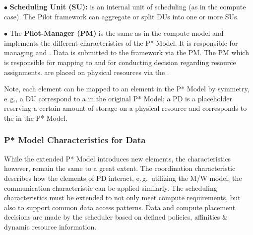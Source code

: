 \documentclass[conference]{IEEEtran}
\begin{document}
\noindent$\bullet$
  \textbf{Scheduling Unit (SU):} is an internal unit of scheduling (as in 
  the compute case). The Pilot framework can aggregate or split DUs into one 
  or more SUs.

\noindent$\bullet$ 
  The \textbf{Pilot-Manager (PM)} is the same as in the compute model and
  implements the different characteristics of the P* Model. It is responsible for
  managing \dus and \sus. Data is submitted to the framework via the PM. The PM
  which is responsible for mapping \dus to \sus and for conducting decision 
  regarding resource assignments. \sus are placed on physical resources via the \pilot.

Note, each element can be mapped to an element in the P* Model by
symmetry, e.\,g., a DU correspond to a \cu  in the original P* Model; 
a PD is a placeholder reserving a certain amount of storage on a physical 
resource and corresponds to the \pilot in the P* Model.



\subsubsection*{P* Model Characteristics for Data}

While the extended P* Model introduces new elements, the
characteristics however, remain the same to a great extent. The
coordination characteristic describes how the elements of PD interact,
e.\,g.\ utilizing the M/W model; the communication characteristic can
be applied similarly. The scheduling characteristics must be extended
to not only meet compute requirements, but also to support common data
access patterns.  Data and compute placement
decisions are made by the scheduler based on defined policies,
affinities \& dynamic resource information.
\end{document}
